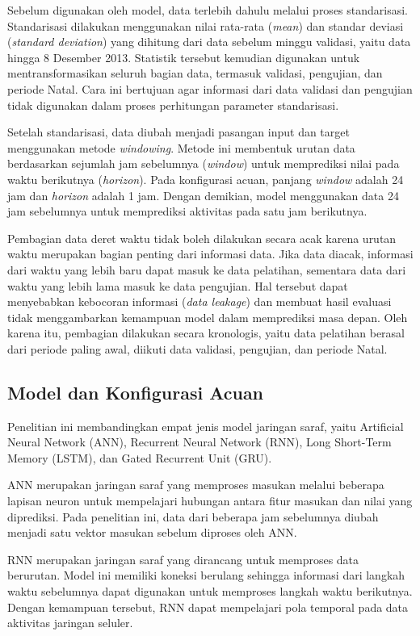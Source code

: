 \documentclass[conference,a4paper]{IEEEtran}
\begin{document}
Sebelum digunakan oleh model, data terlebih dahulu melalui proses standarisasi. Standarisasi dilakukan menggunakan nilai rata-rata (\textit{mean}) dan standar deviasi (\textit{standard deviation}) yang dihitung dari data sebelum minggu validasi, yaitu data hingga 8 Desember 2013. Statistik tersebut kemudian digunakan untuk mentransformasikan seluruh bagian data, termasuk validasi, pengujian, dan periode Natal. Cara ini bertujuan agar informasi dari data validasi dan pengujian tidak digunakan dalam proses perhitungan parameter standarisasi.

Setelah standarisasi, data diubah menjadi pasangan input dan target menggunakan metode \textit{windowing}. Metode ini membentuk urutan data berdasarkan sejumlah jam sebelumnya (\textit{window}) untuk memprediksi nilai pada waktu berikutnya (\textit{horizon}). Pada konfigurasi acuan, panjang \textit{window} adalah 24 jam dan \textit{horizon} adalah 1 jam. Dengan demikian, model menggunakan data 24 jam sebelumnya untuk memprediksi aktivitas pada satu jam berikutnya.

Pembagian data deret waktu tidak boleh dilakukan secara acak karena urutan waktu merupakan bagian penting dari informasi data. Jika data diacak, informasi dari waktu yang lebih baru dapat masuk ke data pelatihan, sementara data dari waktu yang lebih lama masuk ke data pengujian. Hal tersebut dapat menyebabkan kebocoran informasi (\textit{data leakage}) dan membuat hasil evaluasi tidak menggambarkan kemampuan model dalam memprediksi masa depan. Oleh karena itu, pembagian dilakukan secara kronologis, yaitu data pelatihan berasal dari periode paling awal, diikuti data validasi, pengujian, dan periode Natal.

\subsection{Model dan Konfigurasi Acuan}
Penelitian ini membandingkan empat jenis model jaringan saraf, yaitu Artificial Neural Network (ANN), Recurrent Neural Network (RNN), Long Short-Term Memory (LSTM), dan Gated Recurrent Unit (GRU).

ANN merupakan jaringan saraf yang memproses masukan melalui beberapa lapisan neuron untuk mempelajari hubungan antara fitur masukan dan nilai yang diprediksi. Pada penelitian ini, data dari beberapa jam sebelumnya diubah menjadi satu vektor masukan sebelum diproses oleh ANN.

RNN merupakan jaringan saraf yang dirancang untuk memproses data berurutan. Model ini memiliki koneksi berulang sehingga informasi dari langkah waktu sebelumnya dapat digunakan untuk memproses langkah waktu berikutnya. Dengan kemampuan tersebut, RNN dapat mempelajari pola temporal pada data aktivitas jaringan seluler.
\end{document}
